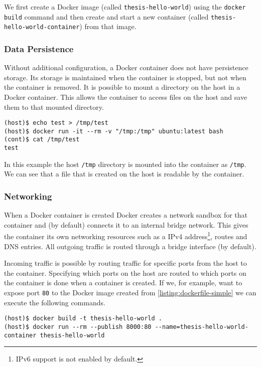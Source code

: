 We first create a Docker image (called \lstinline{thesis-hello-world}) using the \lstinline{docker build} command and then create and start a new container (called \lstinline{thesis-hello-world-container}) from that image.

\subsubsection{Data Persistence}
Without additional configuration, a Docker container does not have persistence storage. Its storage is maintained when the container is stopped, but not when the container is removed. It is possible to mount a directory on the host in a Docker container. This allows the container to access files on the host and save them to that mounted directory.

\begin{lstlisting}[caption={Bind mount example},label={listing:docker-volume},captionpos=b]
(host)$ echo test > /tmp/test
(host)$ docker run -it --rm -v "/tmp:/tmp" ubuntu:latest bash
(cont)$ cat /tmp/test
test
\end{lstlisting}

In this example the host \lstinline{/tmp} directory is mounted into the container as \lstinline{/tmp}. We can see that a file that is created on the host is readable by the container.

\subsubsection{Networking}
When a Docker container is created Docker creates a network sandbox for that container and (by default) connects it to an internal bridge network. This gives the container its own networking resources such as a IPv4 address\footnote{IPv6 support is not enabled by default.}, routes and DNS entries. All outgoing traffic is routed through a bridge interface (by default).

\hfill

Incoming traffic is possible by routing traffic for specific ports from the host to the container.
Specifying which ports on the host are routed to which ports on the container is done when a container is created. If we, for example, want to expose port \lstinline{80} to the Docker image created from \autoref{listing:dockerfile-simple} we can execute the following commands.

\begin{lstlisting}[caption={Creating a Docker container with exposed port},label={listing:docker-port},captionpos=b]
(host)$ docker build -t thesis-hello-world .
(host)$ docker run --rm --publish 8000:80 --name=thesis-hello-world-container thesis-hello-world
\end{lstlisting}

